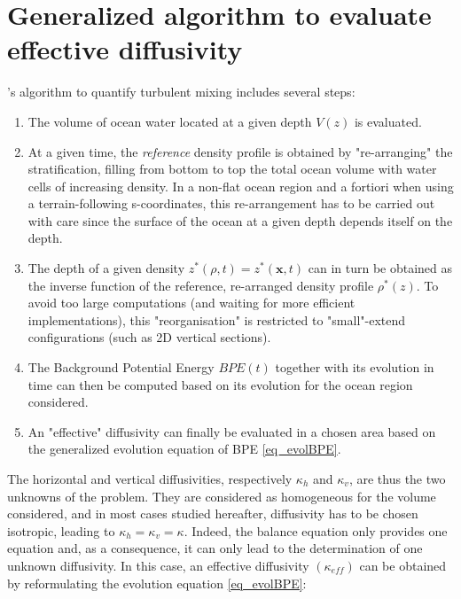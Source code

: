 \section{Generalized algorithm to evaluate effective diffusivity}
\label{BPE_algo}
\cite{winters_available_1995}'s algorithm to quantify turbulent mixing includes several steps:
\begin{enumerate}
\setlength\itemsep{0pt}
\item The volume of ocean water located at a given depth $V(z)$ is evaluated. 
\item At a given time, the \textit{reference} density profile is obtained by "re-arranging" the stratification, filling from bottom to top the total ocean volume with water cells of increasing density. In a non-flat ocean region and a fortiori when using a terrain-following s-coordinates, this re-arrangement has to be carried out with care since the surface of the ocean at a given depth depends itself on the depth.
\item The depth of a given density $z^*(\rho,t)=z^*(\mathbf{x},t)$ can in turn be obtained as the inverse function of the reference, re-arranged density profile $\rho^*(z)$. To avoid too large computations (and waiting for more efficient implementations), this "reorganisation" is restricted to "small"-extend configurations (such as 2D vertical sections).
\item The Background Potential Energy $BPE(t)$ together with its evolution in time can then be computed based on its evolution for the ocean region considered.
\item An "effective" diffusivity can finally be evaluated in a chosen area based on the generalized evolution equation of BPE \ref{eq_evolBPE}.
\end{enumerate}
The horizontal and vertical diffusivities, respectively $\kappa_h$ and $\kappa_v$, are thus the two unknowns of the problem. They are considered as homogeneous for the volume considered, and in most cases studied hereafter, diffusivity has to be chosen isotropic, leading to $\kappa_h=\kappa_v=\kappa$. Indeed, the balance equation only provides one equation and, as a consequence, it can only lead to the determination of one unknown diffusivity.
In this case, an effective diffusivity $(\kappa_{eff})$ can be obtained by reformulating the evolution equation \ref{eq_evolBPE}:
